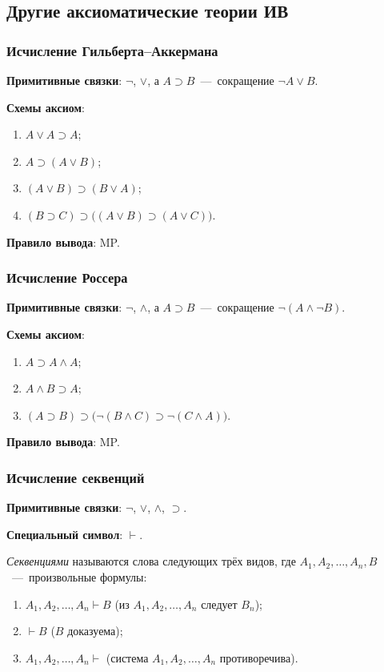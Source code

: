 \subsection{Другие аксиоматические теории ИВ}
\subsubsection{Исчисление Гильберта--Аккермана}

\textbf{Примитивные связки}: $\neg$, $\lor$, а $A \supset B$~---~сокращение $\neg A \lor B$.

\textbf{Схемы аксиом}:
\begin{enumerate}[label=(А\arabic*)]
    \item $A \lor A \supset A$;
    \item $A \supset (A \lor B)$;
    \item $(A \lor B) \supset (B \lor A)$;
    \item $(B \supset C) \supset \big((A \lor B) \supset (A \lor C)\big)$.
\end{enumerate}

\textbf{Правило вывода}: MP.

\subsubsection{Исчисление Россера}
\textbf{Примитивные связки}: $\neg$, $\land$, а $A \supset B$~---~сокращение $\neg(A \land \neg B)$.

\textbf{Схемы аксиом}:
\begin{enumerate}[label=(А\arabic*)]
    \item $A \supset A \land A$;
    \item $A \land B \supset A$;
    \item $(A \supset B) \supset \big(\neg(B \land C) \supset \neg(C \land A)\big)$.
\end{enumerate}

\textbf{Правило вывода}: MP.

\subsubsection{Исчисление секвенций}
\textbf{Примитивные связки}: $\neg$, $\lor$, $\land$, $\supset$.

\textbf{Специальный символ}: $\vdash$.

\textit{Секвенциями} называются слова следующих трёх видов, где $A_1, A_2, \dots, A_n, B$~---~произвольные формулы:
\begin{enumerate}
    \item $A_1, A_2, \dots, A_n \vdash B$ (из $A_1, A_2, \dots, A_n$ следует $B_n$);
    \item $\vdash B$ ($B$ доказуема);
    \item $A_1, A_2, \dots, A_n \vdash$ (система $A_1, A_2, \dots, A_n$ противоречива).
\end{enumerate}


